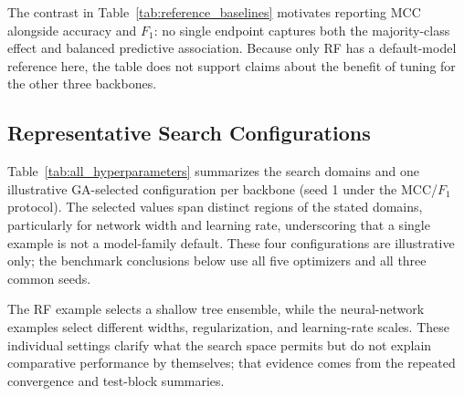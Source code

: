 The contrast in Table~\ref{tab:reference_baselines} motivates reporting MCC alongside accuracy and $F_1$: no single endpoint captures both the majority-class effect and balanced predictive association. Because only RF has a default-model reference here, the table does not support claims about the benefit of tuning for the other three backbones.

\subsection{Representative Search Configurations}
\label{sec:performance_models}

Table~\ref{tab:all_hyperparameters} summarizes the search domains and one illustrative GA-selected configuration per backbone (seed 1 under the MCC/$F_1$ protocol). The selected values span distinct regions of the stated domains, particularly for network width and learning rate, underscoring that a single example is not a model-family default. These four configurations are illustrative only; the benchmark conclusions below use all five optimizers and all three common seeds.

The RF example selects a shallow tree ensemble, while the neural-network examples select different widths, regularization, and learning-rate scales. These individual settings clarify what the search space permits but do not explain comparative performance by themselves; that evidence comes from the repeated convergence and test-block summaries.

